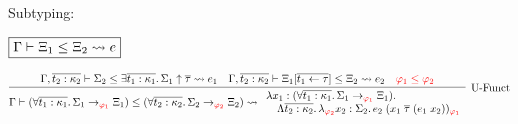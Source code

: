 Subtyping:

$\fbox{$\Gamma \vdash \Xi_1 \leq \Xi_2 \rightsquigarrow e$}$

\begin{gather*}
  \infer[\text{U-Funct}]{
    \Gamma \vdash (\forall \overline{t_1: \kappa_1}\ldotp \Sigma_1 \to_{\textcolor{red}{\varphi_1}} \Xi_1) \leq (\forall \overline{t_2: \kappa_2}\ldotp \Sigma_2 \to_{\textcolor{red}{\varphi_2}} \Xi_2) \elaborate
    \begin{array}{l}
      \lambda x_1: (\forall \overline{t_1: \kappa_1}\ldotp \Sigma_1 \to_{\textcolor{red}{\varphi_1}} \Xi_1)\ldotp \\
      \hspace{1em}\Lambda \overline{t_2: \kappa_2}\ldotp \lambda_{\textcolor{red}{\varphi_2}} x_2: \Sigma_2\ldotp
      e_2\; (x_1\; \overline{\tau}\; (e_1\; x_2))_{\textcolor{red}{\varphi_1}}
    \end{array}
  }{
    \Gamma, \overline{t_2: \kappa_2} \vdash \Sigma_2 \leq \exists \overline{t_1: \kappa_1}\ldotp \Sigma_1 \uparrow \overline{\tau} \elaborate e_1
    &
    \Gamma, \overline{t_2: \kappa_2} \vdash \Xi_1[\overline{t_1 \assign \tau}] \leq \Xi_2 \elaborate e_2
    &
    \textcolor{red}{\varphi_1 \leq \varphi_2}
  }
\end{gather*}
